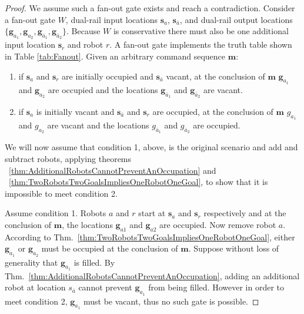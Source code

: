 \documentclass[letterpaper, 10 pt, conference]{ieeeconf}
\begin{document}

\begin{proof} We assume such a {\sc fan-out} gate exists and reach a contradiction. 
Consider a  {\sc fan-out} gate $W$,  dual-rail input locations  $\bm{s}_{a}$, $\bm{s}_{\bar{a}}$, and dual-rail output locations  $\{\bm{g}_{a_1}, \bm{g}_{a_2},\bm{g}_{\bar{a}_1},\bm{g}_{\bar{a}_2}\}$. Because $W$ is conservative there must also be one additional input location $\bm{s}_r$ and robot $r$. A {\sc fan-out} gate implements the truth table shown in Table \ref{tab:Fanout}. Given an arbitrary command sequence $\bm{m}$:  
\begin{enumerate}
\item if $\bm{s}_{a}$  and $\bm{s}_r$ are initially occupied and $\bm{s}_{\bar{a}}$ vacant, at the conclusion of $\bm{m}$ $\bm{g}_{a_1}$ and $\bm{g}_{a_2}$ are occupied and the locations  $\bm{g}_{\bar{a}_1}$ and $\bm{g}_{\bar{a}_2}$ are vacant.
\item if $\bm{s}_{a}$ is initially vacant and $\bm{s}_{\bar{a}}$ and $\bm{s}_r$ are occupied, at the conclusion of $\bm{m}$ $g_{a_1}$ and $g_{a_2}$ are vacant and the locations  $g_{\bar{a}_1}$ and $g_{\bar{a}_2}$ are occupied.
\end{enumerate}

We will now assume that condition 1, above, is the original scenario and  add and subtract robots, applying theorems ~\ref{thm:AdditionalRobotsCannotPreventAnOccupation} and ~\ref{thm:TwoRobotsTwoGoalsImpliesOneRobotOneGoal}, to show that it is impossible to meet condition 2. 

Assume condition 1. Robots $a$ and $r$ start at $\bm{s}_{a}$ and $\bm{s}_r$  respectively and at the conclusion of $\bm{m}$, the locations  $\bm{g}_{a1}$ and $\bm{g}_{a2}$ are occupied. Now remove robot $a$. According to  Thm.~\ref{thm:TwoRobotsTwoGoalsImpliesOneRobotOneGoal}, either $\bm{g}_{a_1}$ or $\bm{g}_{a_2}$ must be occupied at the conclusion of $\bm{m}$. Suppose without loss of generality that $\bm{g}_{a_1}$ is filled.  By Thm.~\ref{thm:AdditionalRobotsCannotPreventAnOccupation}, adding an additional robot at location $s_{\bar{a}}$ cannot prevent $\bm{g}_{a_1}$ from being filled. However in order to meet condition 2, $\bm{g}_{a_1}$ must be vacant, thus no such gate is possible. 
 \end{proof}
\end{document}
